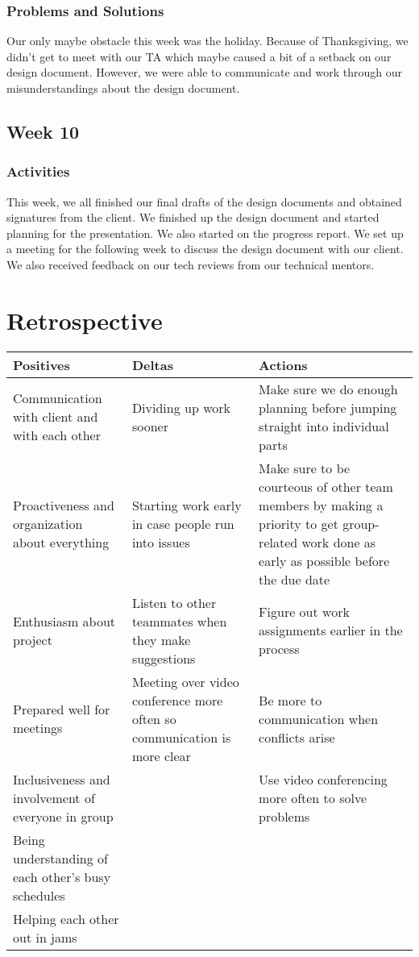 \documentclass[onecolumn, draftclsnofoot,10pt, compsoc]{IEEEtran}
\begin{document}
\subsubsection{Problems and Solutions}
Our only maybe obstacle this week was the holiday. Because of Thanksgiving, we didn’t get to meet with our TA which maybe caused a bit of a setback on our design document. However, we were able to communicate and work through our misunderstandings about the design document. 

\subsection{Week 10}
\subsubsection{Activities}
This week, we all finished our final drafts of the design documents and obtained signatures from the client. We finished up the design document and started planning for the presentation. We also started on the progress report. We set up a meeting for the following week to discuss the design document with our client. We also received feedback on our tech reviews from our technical mentors.

\section{Retrospective}
\begin{center}
    \begin{tabular}{ | p{5cm} | p{5cm} | p{5cm} |}
    \hline
    \textbf{Positives} & \textbf{Deltas} & \textbf{Actions} \\ \hline
   Communication with client and with each other & Dividing up work sooner & Make sure we do enough planning before jumping straight into individual parts \\ \hline
     Proactiveness and organization about everything & Starting work early in case people run into issues & Make sure to be courteous of other team members by making a priority to get group-related work done as early as possible before the due date  \\ \hline
     Enthusiasm about project  & Listen to other teammates when they make suggestions & Figure out work assignments earlier in the process \\ \hline
      Prepared well for meetings & Meeting over video conference more often so communication is more clear & Be more to communication when conflicts arise\\ \hline
       Inclusiveness and involvement of everyone in group &   & Use video conferencing more often to solve problems \\ \hline
     Being understanding of each other’s busy schedules  &    & \\ \hline
      Helping each other out in jams  & &\\ \hline
    \end{tabular}
\end{center}
\end{document}
